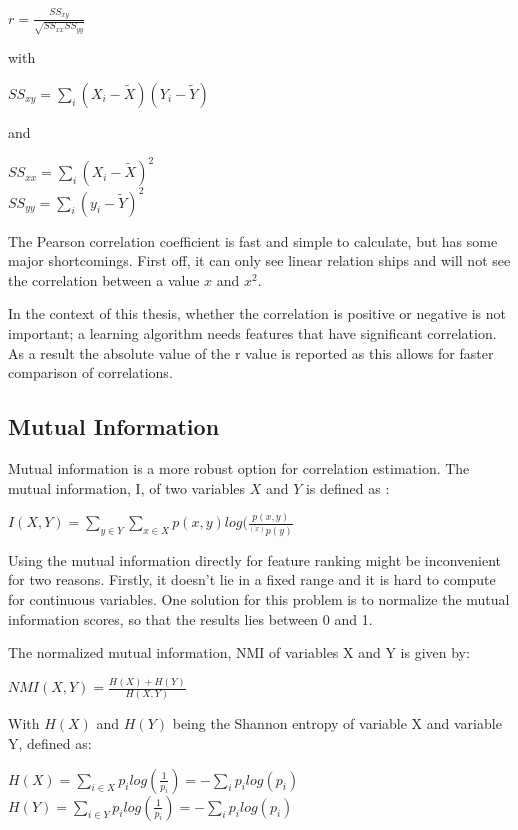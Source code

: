 \begin{center}
$r = \frac{SS_{xy}}{\sqrt{SS_{xx}SS_{yy}}}$
\end{center}
with
\begin{center}
$SS_{xy} = \sum\limits_i (X_i-\tilde{X})(Y_i-\tilde{Y})$
\end{center}
and
\begin{center}
$SS_{xx} = \sum\limits_i (X_i-\tilde{X})^2$ \\
$SS_{yy} = \sum\limits_i (y_i-\tilde{Y})^2$
\end{center}

\npar

The Pearson correlation coefficient is fast and simple to calculate, but has some major shortcomings. First off, it can only see linear relation ships and will not see the correlation between a value $x$ and $x^2$.

\npar

In the context of this thesis, whether the correlation is positive or negative is not important; a learning algorithm needs features that have significant correlation. As a result the absolute value of the r value is reported as this allows for faster comparison of correlations.

\subsection{Mutual Information}
Mutual information is a more robust option for correlation estimation. The mutual information, I, of two variables $X$ and $Y$ is defined as \citep{mutPaper}:
\begin{center}
$I(X,Y) = \sum\limits_{y\in Y} \sum\limits_{x\in X} p(x,y)log(\frac{p(x,y)}{^(x)p(y)}$
\end{center}

\npar

Using the mutual information directly for feature ranking might be inconvenient for two reasons. Firstly, it doesn't lie in a fixed range and it is hard to compute for continuous variables. One solution for this problem is to normalize the mutual information scores, so that the results lies between 0 and 1.

The normalized mutual information, NMI of variables X and Y is given by:
\begin{center}
$NMI(X,Y) = \frac{H(X) + H(Y)}{H(X,Y)}$
\end{center}
With $H(X)$ and $H(Y)$ being the Shannon entropy of variable X and variable Y, defined as:
\begin{center}
$H(X) = \sum\limits_{i\in X} p_ilog(\frac{1}{p_i}) = - \sum\limits_i p_ilog(p_i)$\\
$H(Y) = \sum\limits_{i\in Y} p_ilog(\frac{1}{p_i}) = - \sum\limits_i p_ilog(p_i)$
\end{center}
\npar

